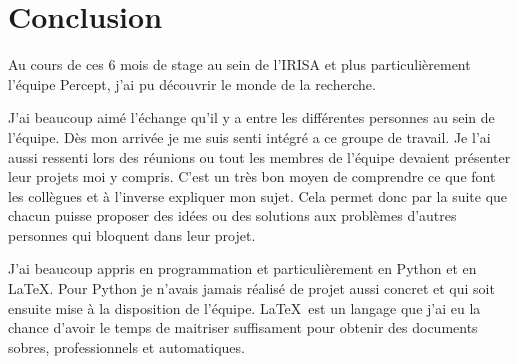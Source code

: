 \chapter{Conclusion}

Au cours de ces 6 mois de stage au sein de l'IRISA et plus particulièrement l'équipe Percept, j'ai pu découvrir le monde de la recherche.

J'ai beaucoup aimé l'échange qu'il y a entre les différentes personnes au sein de l'équipe. Dès mon arrivée je me suis senti intégré a ce groupe de travail. Je l'ai aussi ressenti lors des réunions ou tout les membres de l'équipe devaient présenter leur projets moi y compris. C'est un très bon moyen de comprendre ce que font les collègues et à l'inverse expliquer mon sujet. Cela permet donc par la suite que chacun puisse proposer des idées ou des solutions aux problèmes d'autres personnes qui bloquent dans leur projet.

J'ai beaucoup appris en programmation et particulièrement en Python et en \LaTeX. Pour Python je n'avais jamais réalisé de projet aussi concret et qui soit ensuite mise à la disposition de l'équipe. \LaTeX\ est un langage que j'ai eu la chance d'avoir le temps de maitriser suffisament pour obtenir des documents sobres, professionnels et automatiques.

